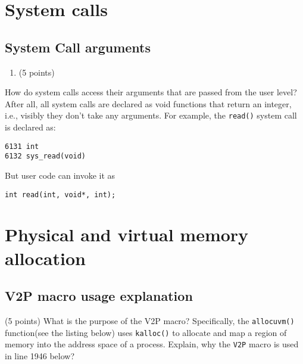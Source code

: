 \documentclass[]{article}
\providecommand{\tightlist}{%
  \setlength{\itemsep}{0pt}\setlength{\parskip}{0pt}}
\begin{document}
\hypertarget{system-calls}{%
\section{System calls}\label{system-calls}}

\hypertarget{system-call-arguments}{%
\subsection{System Call arguments}\label{system-call-arguments}}

\begin{enumerate}
\def\labelenumi{(\alph{enumi})}
\tightlist
\item
  (5 points)
\end{enumerate}

How do system calls access their arguments that are passed from the user
level? After all, all system calls are declared as void functions that
return an integer, i.e., visibly they don't take any arguments. For
example, the \texttt{read()} system call is declared as:

\begin{verbatim}
6131 int
6132 sys_read(void)
\end{verbatim}

But user code can invoke it as

\begin{verbatim}
int read(int, void*, int);
\end{verbatim}

\hypertarget{physical-and-virtual-memory-allocation}{%
\section{Physical and virtual memory
allocation}\label{physical-and-virtual-memory-allocation}}

\hypertarget{v2p-macro-usage-explanation}{%
\subsection{V2P macro usage
explanation}\label{v2p-macro-usage-explanation}}

(5 points) What is the purpose of the V2P macro? Specifically, the
\texttt{allocuvm()} function(see the listing below) uses
\texttt{kalloc()} to allocate and map a region of memory into the
address space of a process. Explain, why the \texttt{V2P} macro is used
in line 1946 below?
\end{document}
